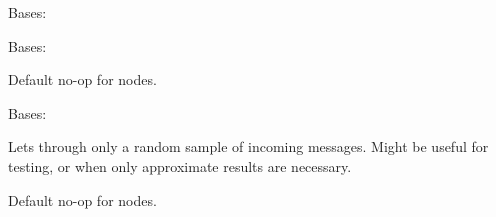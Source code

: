 \documentclass[letterpaper,10pt,english]{sphinxmanual}
\begin{document}
\begin{fulllineitems}
\label{\detokenize{api:nanostream.node.Parameters}}
Bases: 

\end{fulllineitems}


\begin{fulllineitems}
\label{\detokenize{api:nanostream.node.PrinterOfThings}}
Bases: {\hyperref[\detokenize{api:nanostream.node.NanoNode}]{}}

\begin{fulllineitems}
\label{\detokenize{api:nanostream.node.PrinterOfThings.process_item}}
Default no-op for nodes.

\end{fulllineitems}


\end{fulllineitems}


\begin{fulllineitems}
\label{\detokenize{api:nanostream.node.RandomSample}}
Bases: {\hyperref[\detokenize{api:nanostream.node.NanoNode}]{}}

Lets through only a random sample of incoming messages. Might be useful
for testing, or when only approximate results are necessary.

\begin{fulllineitems}
\label{\detokenize{api:nanostream.node.RandomSample.process_item}}
Default no-op for nodes.

\end{fulllineitems}


\end{fulllineitems}
\end{document}
